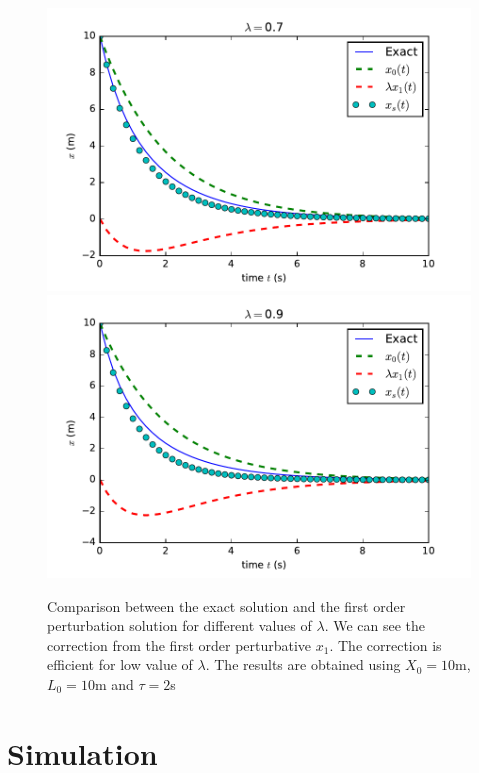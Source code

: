 \documentclass[a4paper,10pt]{article}
\begin{document}
\begin{figure}[!hp]
\hspace*{-2.1cm}\includegraphics[width=4.5in]{PT_lambda=07.pdf}\hspace*{-1.1cm}\includegraphics[width=4.5in]{PT_lambda=09.pdf}
\caption{Comparison between the exact solution and the first order perturbation solution for different values of $\lambda$. We can see the correction from the first order perturbative $x_1$. The correction is efficient for low value of $\lambda$. The results are obtained using $X_0=10$m, $L_0=10$m and $\tau=2$s }
\label{default}
\end{figure}

\newpage
\section{Simulation}
\end{document}
